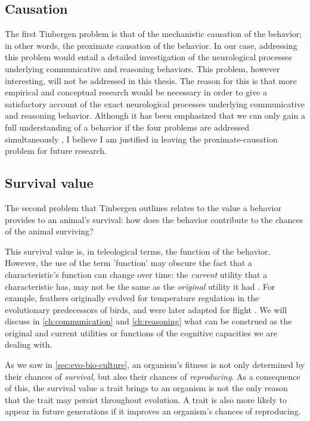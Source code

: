 \subsection{Causation}
The first Tinbergen problem is that of the mechanistic causation of the behavior; in other words, the proximate causation of the behavior. In our case, addressing this problem would entail a detailed investigation of the neurological processes underlying communicative and reasoning behaviors.
This problem, however interesting, will not be addressed in this thesis. The reason for this is that more empirical and conceptual research would be necessary in order to give a satisfactory account of the exact neurological processes underlying communicative and reasoning behavior. Although it has been emphasized that we can only gain a full understanding of a behavior if the four problems are addressed simultaneously \citep{Tinbergen63, BatesonLaland13}, I believe I am justified in leaving the proximate-causation problem for future research.

\subsection{Survival value}
The second problem that Tinbergen outlines relates to the value a behavior provides to an animal's survival: how does the behavior contribute to the chances of the animal surviving?

This survival value is, in teleological terms, the function of the behavior.  However, the use of the term 'function' may obscure the fact that a characteristic's function can change over time: the \emph{current} utility that a characteristic has, may not be the same as the \emph{original} utility it had \citep{BatesonLaland13}. For example, feathers originally evolved for temperature regulation in the evolutionary predecessors of birds, and were later adapted for flight \citep{Benton19, BatesonLaland13}.
We will discuss in \cref{ch:communication} and \cref{ch:reasoning} what can be construed as the original and current utilities or functions of the cognitive capacities we are dealing with.

As we saw in \cref{sec:evo-bio-culture}, an organism's fitness is not only determined by their chances of \emph{survival}, but also their chances of \emph{reproducing}. As a consequence of this, the survival value a trait brings to an organism is not the only reason that the trait may persist throughout evolution. A trait is also more likely to appear in future generations if it improves an organism's chances of reproducing.

